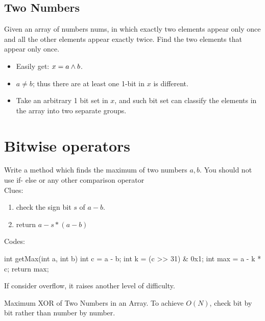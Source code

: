 \subsection{Two Numbers} 
Given an array of numbers nums, in which exactly two elements appear only once and all the other elements appear exactly twice. Find the two elements that appear only once.

\begin{itemize}
\item Easily get: $x = a \wedge b$.
\item $a \neq b$; thus there are at least one 1-bit in $x$ is different.  
\item Take an arbitrary 1 bit set in $x$, and such bit set can classify the elements in the array into two separate groups.
\end{itemize}

\section{Bitwise operators}
 Write a method which finds the maximum of two numbers $a, b$. You should not use if- else or any other comparison operator
\\
Clues:
\begin{enumerate}
\item check the sign bit $s$ of $a-b$.
\item return $a-s*(a-b)$
\end{enumerate}
Codes:
\begin{java}
int getMax(int a, int b) { 
    int c = a - b;
    int k = (c >> 31) & 0x1; 
    int max = a - k * c; 
    return max;
}

\end{java}
If consider overflow, it raises another level of difficulty. 

 Maximum XOR of Two Numbers in an Array. To achieve $O(N)$, check bit by bit rather than number by number.

